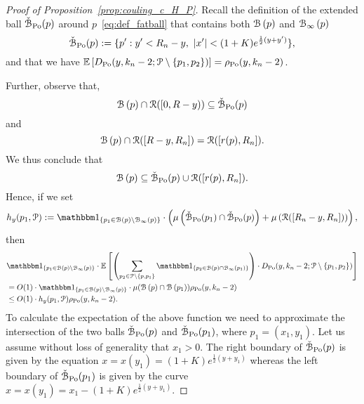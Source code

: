 \begin{proof}[Proof of Proposition~\ref{prop:couling_c_H_P}]
Recall the definition of the extended ball $\check{{\mathcal B}}_{{\mathrm{Po}}}(p)$ around $p$~\eqref{eq:def_fatball} that contains both ${\mathcal B}\left(p\right)$ and ${\mathcal B}_{\infty}\left(p\right)$ 
\[
	\check{{\mathcal B}}_{{\mathrm{Po}}}(p) : = \{ p^\prime : y^\prime < R_n - y, \ |x^\prime| < (1+K) e^{\frac{1}{2} (y + y^\prime)}  \},
\]
and that we have $\mathbb{E}\left[D_{{\mathrm{Po}}} (y,k_n-2;{\mathcal P} \setminus \{ p_1,p_2\})\right] = \rho_{{\mathrm{Po}}}(y,k_n-2)$.

Further, observe that,
\begin{equation*} %
\BallHyp{p} \cap \Rcal ([0,R-y)) \subseteq \FatBallHyp{p}
\end{equation*}
and 
\begin{equation*} %
\BallHyp{p} \cap \Rcal ([R-y,R_n]) = \Rcal ([r(p),R_n]).
\end{equation*}
We thus conclude that 
\begin{equation} \label{eq:ball_inclusions}
{\mathcal B}\left(p\right) \subseteq \check{{\mathcal B}}_{{\mathrm{Po}}}(p) \cup {\mathcal R}([r(p),R_n]).
\end{equation}
Hence, if we set 
\[
h_y(p_1, \Pcal) := \ind{p_1 \in \BallHyp{p}\setminus \BallPo{p}} \cdot    
\left( \mu \left( \FatBallHyp{p_1} \cap \FatBallHyp{p} \right)
+ \mu \left( \Rcal([R_n-y,R_n]) \right) \right),
\]
then 
\begin{align*}
&\ind{p_1\in \BallHyp{p}\setminus \BallPo{p}} \cdot \Exp{ \left(\sum_{p_2 \in \Pcal \setminus 
\{p,p_1\}} \ind{p_2 \in \BallHyp{p} \cap \BallPo{p_1}}\right) \cdot 
D_{\Po} (y,k_n-2;\Pcal \setminus \{ p_1, p_2\})
} \\
&=O(1)\cdot
\ind{p_1\in \BallHyp{p}\setminus \BallPo{p}} \cdot \mu (\BallHyp{p}\cap \BallHyp{p_1}) \rho_{\Po}(y,k_n-2) \\
& \leq O(1) \cdot  h_y (p_1, \Pcal) \rho_{\Po}(y,k_n-2) . 
\end{align*}
To calculate the expectation of the above function we need to approximate the 
intersection of the two balls $\check{{\mathcal B}}_{{\mathrm{Po}}}(p)$ and $\check{{\mathcal B}}_{{\mathrm{Po}}}(p_1)$, 
where $p_1= (x_1,y_1)$. 
Let us assume without loss of generality that $x_1 > 0$. 
The right boundary of $\check{{\mathcal B}}_{{\mathrm{Po}}}(p)$ is given by the equation 
$x = x(y_1) = (1+K)e^{\frac{1}{2} (y + y_1)}$ whereas the left boundary of $\check{{\mathcal B}}_{{\mathrm{Po}}}(p_1)$ is given by the curve $x = x(y_1)= x_1 - (1+ K)e^{\frac{1}{2} (y + y_1)}.$ 


\end{proof}
